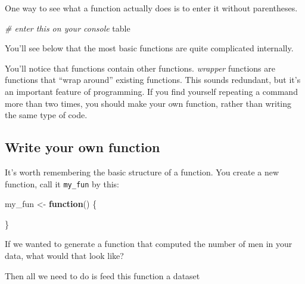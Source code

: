 \documentclass[]{book}
\newenvironment{Shaded}{\begin{snugshade}}{\end{snugshade}}
\newcommand{\KeywordTok}[1]{\textcolor[rgb]{0.13,0.29,0.53}{\textbf{#1}}}
\newcommand{\StringTok}[1]{\textcolor[rgb]{0.31,0.60,0.02}{#1}}
\newcommand{\CommentTok}[1]{\textcolor[rgb]{0.56,0.35,0.01}{\textit{#1}}}
\newcommand{\ControlFlowTok}[1]{\textcolor[rgb]{0.13,0.29,0.53}{\textbf{#1}}}
\newcommand{\OperatorTok}[1]{\textcolor[rgb]{0.81,0.36,0.00}{\textbf{#1}}}
\newcommand{\NormalTok}[1]{#1}
\theoremstyle{definition}
\theoremstyle{definition}
\theoremstyle{definition}
\theoremstyle{remark}
\begin{document}
One way to see what a function actually does is to enter it without
parentheses.

\begin{Shaded}
\begin{Highlighting}[]
\CommentTok{# enter this on your console}
\NormalTok{table}
\end{Highlighting}
\end{Shaded}

You'll see below that the most basic functions are quite complicated
internally.

You'll notice that functions contain other functions. \emph{wrapper}
functions are functions that ``wrap around'' existing functions. This
sounds redundant, but it's an important feature of programming. If you
find yourself repeating a command more than two times, you should make
your own function, rather than writing the same type of code.

\subsection{Write your own function}\label{write-your-own-function}

It's worth remembering the basic structure of a function. You create a
new function, call it \texttt{my\_fun} by this:

\begin{Shaded}
\begin{Highlighting}[]
\NormalTok{my_fun <-}\StringTok{ }\ControlFlowTok{function}\NormalTok{() \{}
  
\NormalTok{\}}
\end{Highlighting}
\end{Shaded}

If we wanted to generate a function that computed the number of men in
your data, what would that look like?

\begin{Shaded}
\end{Shaded}

Then all we need to do is feed this function a dataset
\end{document}
